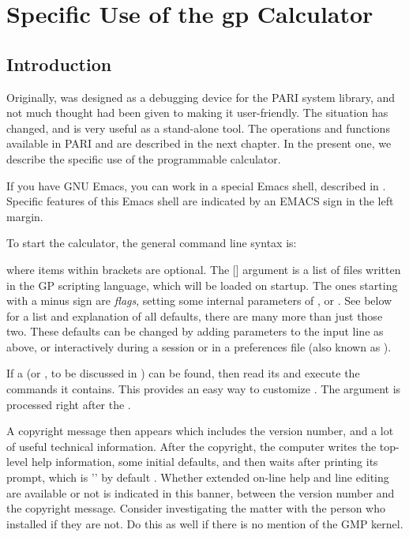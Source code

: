 %
%
\chapter{Specific Use of the gp Calculator}

\section{Introduction}

Originally,  was designed as a debugging device for the PARI system
library, and not much thought had been given to making it user-friendly. The
situation has changed, and  is very useful as a stand-alone tool. The
operations and functions available in PARI and  are described in
the next chapter. In the present one, we describe the specific use of the
 programmable calculator.

\emacs If you have GNU Emacs, you can work in a special Emacs shell,
described in . Specific features of this Emacs shell are
indicated by an EMACS sign in the left margin.


To start the calculator, the general command line syntax is:


\noindent
where items within brackets are optional. The [] argument is a
list of files written in the GP scripting language, which will be loaded on
startup. The ones starting with a minus sign are \emph{flags}, setting some
internal parameters of , or . See 
below for a list and explanation of all defaults, there are many more than
just those two. These defaults can be changed by adding parameters to the
input line as above, or interactively during a  session or in a
preferences file (also known as ).

If a  (or , to be discussed in
) can be found,  then read its and execute the
commands it contains. This provides an easy way to customize .
The  argument is processed right after the .

A copyright message then appears which includes the version number, and a lot
of useful technical information. After the copyright, the computer writes the
top-level help information, some initial defaults, and then waits after
printing its prompt, which is '' by default . Whether extended
on-line help and line editing are available or not is indicated in this
 banner, between the version number and the copyright message.
Consider investigating the matter with the person who installed  if
they are not. Do this as well if there is no mention of the GMP kernel.

